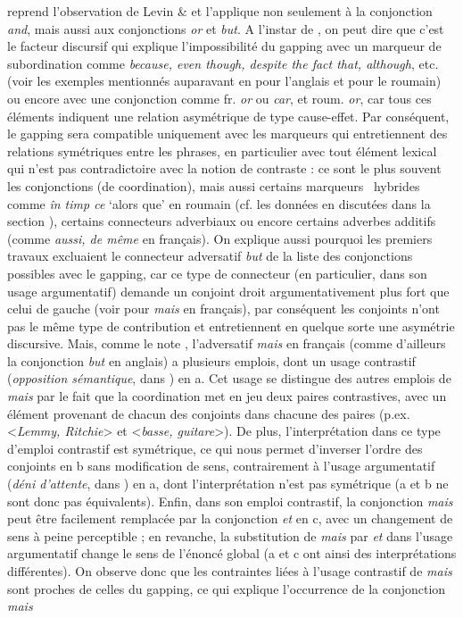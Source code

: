\citet{Kehler2002} reprend l'observation de Levin \& \citet{Prince1986} et l'applique non seulement à la conjonction \textit{and}, mais aussi aux conjonctions \textit{or} et \textit{but}. A l'instar de \citet{Kehler2002}, on peut dire que c'est le facteur discursif qui explique l'impossibilité du gapping avec un marqueur de subordination comme \textit{because, even though, despite the fact that, although}, etc. (voir les exemples mentionnés auparavant en  pour l'anglais et  pour le roumain) ou encore avec une conjonction comme fr. \textit{or} ou \textit{car}, et roum. \textit{or}, car tous ces éléments indiquent une relation asymétrique de type cause-effet. Par conséquent, le gapping sera compatible uniquement avec les marqueurs qui entretiennent des relations symétriques entre les phrases, en particulier avec tout élément lexical qui n'est pas contradictoire avec la notion de contraste : ce sont le plus souvent les conjonctions (de coordination), mais aussi certains marqueurs {\guillemotleft}~hybrides~{\guillemotright} comme \textit{în timp ce} `alors que' en roumain (cf. les données en  discutées dans la section ), certains connecteurs adverbiaux  ou encore certains adverbes additifs (comme \textit{aussi, de même} en français). On explique aussi pourquoi les premiers travaux excluaient le connecteur adversatif \textit{but} de la liste des conjonctions possibles avec le gapping, car ce type de connecteur (en particulier, dans son usage argumentatif) demande un conjoint droit argumentativement plus fort que celui de gauche (voir \citet{Winterstein2010} pour \textit{mais} en français), par conséquent les conjoints n'ont pas le même type de contribution et entretiennent en quelque sorte une asymétrie discursive. Mais, comme le note \citet{Winterstein2010}, l'adversatif \textit{mais} en français (comme d'ailleurs la conjonction \textit{but} en anglais) a plusieurs emplois, dont un usage contrastif (\textit{opposition sémantique}, dans \citet{Lakoff1971}) en a. Cet usage se distingue des autres emplois de \textit{mais} par le fait que la coordination met en jeu deux paires contrastives, avec un élément provenant de chacun des conjoints dans chacune des paires (p.ex. {\textless}\textit{Lemmy, Ritchie}{\textgreater} et {\textless}\textit{basse, guitare}{\textgreater}). De plus, l'interprétation dans ce type d'emploi contrastif est symétrique, ce qui nous permet d'inverser l'ordre des conjoints en b sans modification de sens, contrairement à l'usage argumentatif (\textit{déni d'attente}, dans \citet{Lakoff1971}) en a, dont l'interprétation n'est pas symétrique (a et b ne sont donc pas équivalents). Enfin, dans son emploi contrastif, la conjonction \textit{mais} peut être facilement remplacée par la conjonction \textit{et} en c, avec un changement de sens à peine perceptible ; en revanche, la substitution de \textit{mais} par \textit{et} dans l'usage argumentatif change le sens de l'énoncé global (a et c ont ainsi des interprétations différentes). On observe donc que les contraintes liées à l'usage contrastif de \textit{mais} sont proches de celles du gapping, ce qui explique l'occurrence de la conjonction \textit{mais} 